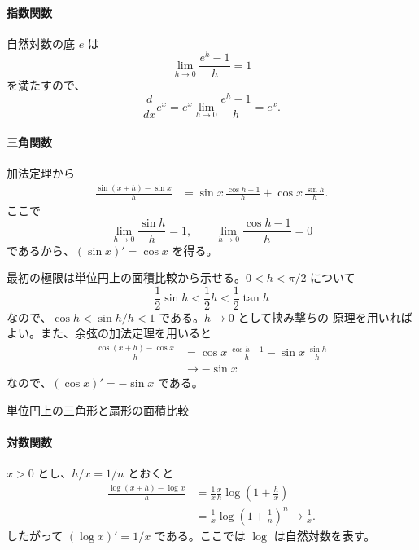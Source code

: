 \paragraph{指数関数}
自然対数の底 $e$ は
\[
 \lim_{h\to0}\frac{e^h-1}{h}=1
\]
を満たすので、
\[
 \frac{d}{dx}e^x
 =e^x\lim_{h\to0}\frac{e^h-1}{h}=e^x.
\]

\paragraph{三角関数}
加法定理から
\begin{align*}
 \frac{\sin(x+h)-\sin x}{h}
 &=\sin x\,\frac{\cos h-1}{h}
   +\cos x\,\frac{\sin h}{h}.
\end{align*}
ここで
\[
 \lim_{h\to0}\frac{\sin h}{h}=1,\qquad
 \lim_{h\to0}\frac{\cos h-1}{h}=0
\]
であるから、$(\sin x)'=\cos x$ を得る。

最初の極限は単位円上の面積比較から示せる。$0<h<\pi/2$ について
\[
 \frac12\sin h<\frac12h<\frac12\tan h
\]
なので、$\cos h<\sin h/h<1$ である。$h\to0$ として挟み撃ちの
原理を用いればよい。また、余弦の加法定理を用いると
\begin{align*}
 \frac{\cos(x+h)-\cos x}{h}
 &=\cos x\,\frac{\cos h-1}{h}
   -\sin x\,\frac{\sin h}{h}\\
 &\longrightarrow-\sin x
\end{align*}
なので、$(\cos x)'=-\sin x$ である。

\begin{center}

\small 単位円上の三角形と扇形の面積比較
\end{center}

\paragraph{対数関数}
$x>0$ とし、$h/x=1/n$ とおくと
\begin{align*}
 \frac{\log(x+h)-\log x}{h}
 &=\frac1x\frac{x}{h}\log\left(1+\frac hx\right)\\
 &=\frac1x\log\left(1+\frac1n\right)^n\longrightarrow\frac1x.
\end{align*}
したがって $(\log x)'=1/x$ である。ここでは $\log$ は自然対数を表す。

